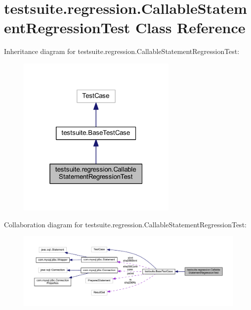 \hypertarget{classtestsuite_1_1regression_1_1_callable_statement_regression_test}{}\section{testsuite.\+regression.\+Callable\+Statement\+Regression\+Test Class Reference}
\label{classtestsuite_1_1regression_1_1_callable_statement_regression_test}


Inheritance diagram for testsuite.\+regression.\+Callable\+Statement\+Regression\+Test\+:
\nopagebreak
\begin{figure}[H]
\begin{center}
\leavevmode
\includegraphics[width=220pt]{classtestsuite_1_1regression_1_1_callable_statement_regression_test__inherit__graph}
\end{center}
\end{figure}


Collaboration diagram for testsuite.\+regression.\+Callable\+Statement\+Regression\+Test\+:
\nopagebreak
\begin{figure}[H]
\begin{center}
\leavevmode
\includegraphics[width=350pt]{classtestsuite_1_1regression_1_1_callable_statement_regression_test__coll__graph}
\end{center}
\end{figure}
